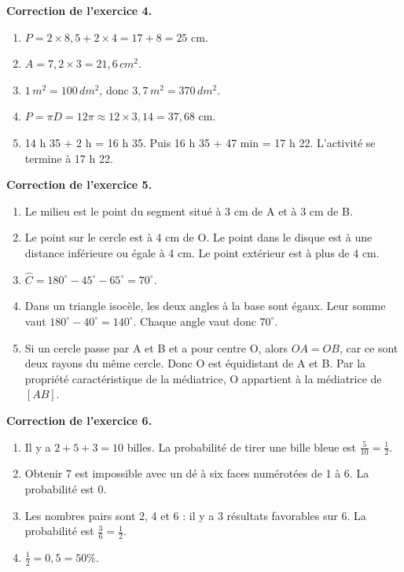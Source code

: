 \documentclass[11pt,a4paper]{article}
\newcounter{exo}
\begin{document}
\begin{corrbox}
\textbf{Correction de l'exercice 4.}
\begin{enumerate}[label=\alph*)]
\item \(P=2\times8,5+2\times4=17+8=25\) cm.
\item \(A=7,2\times3=21,6\,cm^2\).
\item \(1\,m^2=100\,dm^2\), donc \(3,7\,m^2=370\,dm^2\).
\item \(P=\pi D=12\pi\approx12\times3,14=37,68\) cm.
\item 14 h 35 + 2 h = 16 h 35. Puis 16 h 35 + 47 min = 17 h 22. L'activité se termine à 17 h 22.
\end{enumerate}
\end{corrbox}

\begin{corrbox}
\textbf{Correction de l'exercice 5.}
\begin{enumerate}[label=\alph*)]
\item Le milieu est le point du segment situé à 3 cm de A et à 3 cm de B.
\item Le point sur le cercle est à 4 cm de O. Le point dans le disque est à une distance inférieure ou égale à 4 cm. Le point extérieur est à plus de 4 cm.
\item \(\widehat C=180^\circ-45^\circ-65^\circ=70^\circ\).
\item Dans un triangle isocèle, les deux angles à la base sont égaux. Leur somme vaut \(180^\circ-40^\circ=140^\circ\). Chaque angle vaut donc \(70^\circ\).
\item Si un cercle passe par A et B et a pour centre O, alors \(OA=OB\), car ce sont deux rayons du même cercle. Donc O est équidistant de A et B. Par la propriété caractéristique de la médiatrice, O appartient à la médiatrice de \([AB]\).
\end{enumerate}
\end{corrbox}

\begin{corrbox}
\textbf{Correction de l'exercice 6.}
\begin{enumerate}[label=\alph*)]
\item Il y a \(2+5+3=10\) billes. La probabilité de tirer une bille bleue est \(\frac5{10}=\frac12\).
\item Obtenir 7 est impossible avec un dé à six faces numérotées de 1 à 6. La probabilité est 0.
\item Les nombres pairs sont 2, 4 et 6 : il y a 3 résultats favorables sur 6. La probabilité est \(\frac36=\frac12\).
\item \(\frac12=0,5=50\%\).
\end{enumerate}
\end{corrbox}
\end{document}
